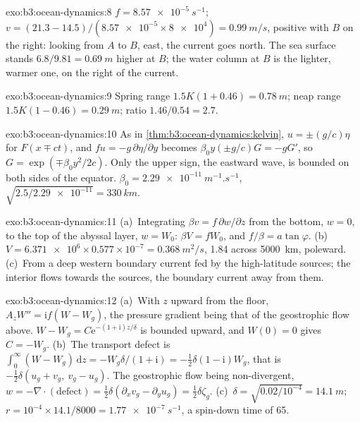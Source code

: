\begin{solution}{exo:b3:ocean-dynamics:8}
$f = \qty{8.57e-5}{s^{-1}}$; $v = (21.3 - 14.5)/(\num{8.57e-5}\times\num{8e4})
= \qty{0.99}{m/s}$, positive with $B$ on the right: looking from $A$ to $B$,
east, the current goes north. The sea surface stands
$6.8/9.81 = \qty{0.69}{m}$ higher at $B$; the water column at $B$ is the
lighter, warmer one, on the right of the current.
\end{solution}

\begin{solution}{exo:b3:ocean-dynamics:9}
Spring range $1.5K(1 + 0.46) = \qty{0.78}{m}$; neap range $1.5K(1 - 0.46)
= \qty{0.29}{m}$; ratio $1.46/0.54 = 2.7$.
\end{solution}

\begin{solution}{exo:b3:ocean-dynamics:10}
As in \cref{thm:b3:ocean-dynamics:kelvin}, $u = \pm(g/c)\eta$ for $F(x \mp
ct)$, and $fu = -g\,\partial\eta/\partial y$ becomes $\beta_0y(\pm g/c)G =
-gG'$, so $G = \exp(\mp\beta_0y^2/2c)$. Only the upper sign, the eastward
wave, is bounded on both sides of the equator. $\beta_0 =
\qty{2.29e-11}{m^{-1}.s^{-1}}$, $\sqrt{2.5/\num{2.29e-11}} = \qty{330}{km}$.
\end{solution}

\begin{solution}{exo:b3:ocean-dynamics:11}
(a)~Integrating $\beta v = f\,\partial w/\partial z$ from the bottom, $w = 0$,
to the top of the abyssal layer, $w = W_0$: $\beta V = fW_0$, and $f/\beta =
a\tan\varphi$. (b)~$V = \num{6.371e6}\times0.577\times10^{-7} =
\qty{0.368}{m^2/s}$, \qty{1.84}{\sverdrup} across \qty{5000}{km}, poleward.
(c)~From a deep western boundary current fed by the high-latitude sources;
the interior flows towards the sources, the boundary current away from
them.
\end{solution}

\begin{solution}{exo:b3:ocean-dynamics:12}
(a)~With $z$ upward from the floor, $A_zW'' = \mathrm if(W - W_g)$, the
pressure gradient being that of the geostrophic flow above. $W - W_g =
C\mathrm e^{-(1+\mathrm i)z/\delta}$ is bounded upward, and $W(0) = 0$ gives
$C = -W_g$. (b)~The transport defect is $\int_0^\infty(W - W_g)\,\mathrm dz
= -W_g\delta/(1+\mathrm i) = -\tfrac12\delta(1 - \mathrm i)W_g$, that is
$-\tfrac12\delta(u_g + v_g,\ v_g - u_g)$. The geostrophic flow being
non-divergent, $w = -\nabla\cdot(\text{defect}) = \tfrac12\delta(\partial_x
v_g - \partial_y u_g) = \tfrac12\delta\zeta_g$. (c)~$\delta =
\sqrt{0.02/10^{-4}} = \qty{14.1}{m}$; $r = 10^{-4}\times14.1/8000 =
\qty{1.77e-7}{s^{-1}}$, a spin-down time of \num{65}.
\end{solution}

